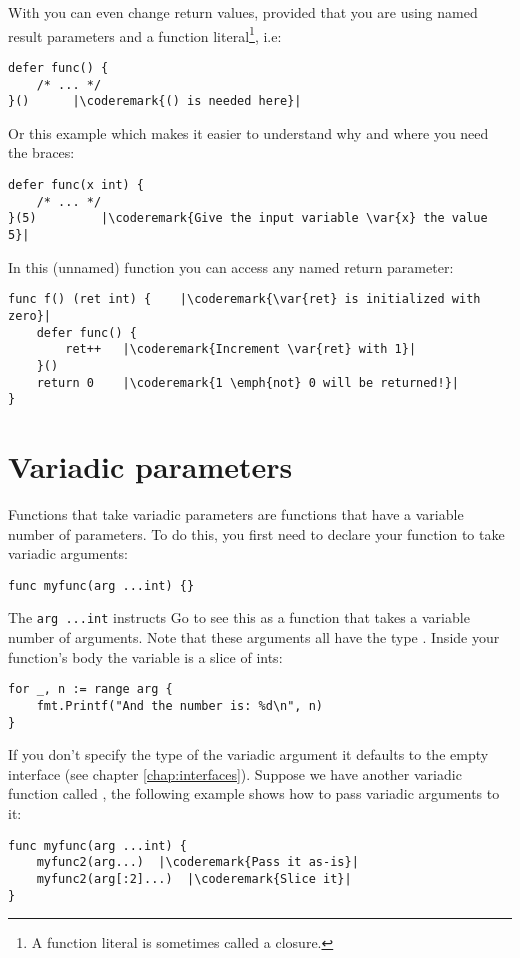 With  you can even change return values, provided that
you are using named result parameters and a function
literal\footnote{A function literal
is sometimes called a  closure.}, i.e:
\begin{lstlisting}[caption=Function literal]
defer func() {
	/* ... */
}()		 |\coderemark{() is needed here}|
\end{lstlisting}
Or this example which makes it easier to understand why and where
you need the braces:
\begin{lstlisting}[caption=Function literal with parameters]
defer func(x int) {
	/* ... */
}(5)		 |\coderemark{Give the input variable \var{x} the value 5}|
\end{lstlisting}
In this (unnamed) function you can access any named return
parameter:
\begin{lstlisting}[caption=Access return values within defer]
func f() (ret int) {    |\coderemark{\var{ret} is initialized with zero}|
	defer func() {
		ret++	|\coderemark{Increment \var{ret} with 1}|
	}()
	return 0	|\coderemark{1 \emph{not} 0 will be returned!}|
}
\end{lstlisting}

\section{Variadic parameters}
Functions that take variadic parameters are functions that have a
variable number of parameters. To do this, you first
need to declare your function to take variadic arguments:
\begin{lstlisting}
func myfunc(arg ...int) {}
\end{lstlisting}
The \lstinline{arg ...int} instructs Go to see this as a function that
takes a variable number of arguments. Note that these arguments all
have the type . Inside your function's body the variable
 is a slice of ints:
\begin{lstlisting}
for _, n := range arg {
    fmt.Printf("And the number is: %d\n", n)
}
\end{lstlisting}
If you don't specify the type of the variadic argument it defaults to the
empty interface  (see chapter
\ref{chap:interfaces}).
Suppose we have another variadic function called , the 
following example shows how to pass variadic arguments to it:
\begin{lstlisting}
func myfunc(arg ...int) {
    myfunc2(arg...)  |\coderemark{Pass it as-is}|
    myfunc2(arg[:2]...)  |\coderemark{Slice it}|
}
\end{lstlisting}

